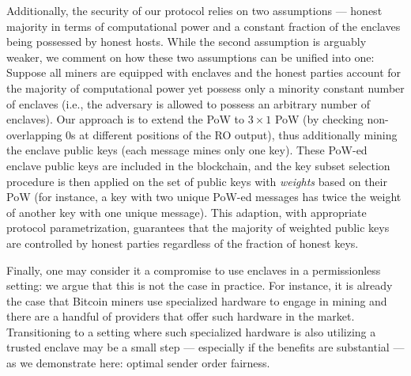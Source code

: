 Additionally, the security of our protocol relies on two assumptions --- honest majority in terms of computational power and a constant fraction of the enclaves being possessed by honest hosts.
%
While the second assumption is arguably weaker, we comment on how these two assumptions can be unified into one:
%
Suppose all miners are equipped with enclaves and the honest parties account for the majority of computational power yet possess only a minority constant number of enclaves (i.e., the adversary is allowed to possess an arbitrary number of enclaves).
%
Our approach is to extend the \twoforone PoW to $3 {\times} 1$ PoW (by checking non-overlapping 0s at different positions of the RO output), thus additionally mining the enclave public keys (each message mines only one key).
%
These PoW-ed enclave public keys are included in the blockchain, and the key subset selection procedure is then applied on the set of public keys with \emph{weights} based on their PoW (for instance, a key with two unique PoW-ed messages has twice the weight of another key with one unique message).
%
This adaption, with appropriate protocol parametrization, guarantees that the majority of weighted public keys are controlled by honest parties regardless of the fraction of honest keys.

Finally, one may consider it a compromise to use enclaves in a permissionless setting: we argue that this is not the case in practice.
%
For instance, it is already the case that Bitcoin miners use specialized hardware to engage in mining and there are a handful of providers that offer such hardware in the market.
%
Transitioning to a setting where such specialized hardware is also utilizing a trusted enclave may be a small step --- especially if the benefits are substantial --- as we demonstrate here: optimal sender order fairness.
